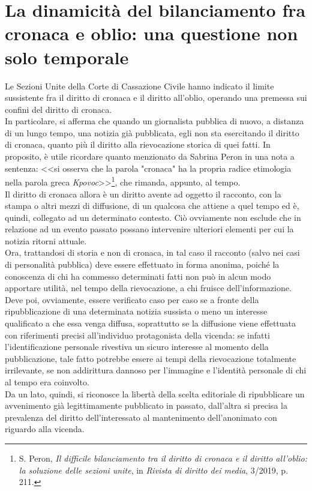 \section{La dinamicità del bilanciamento fra cronaca e oblio: una questione non solo temporale}
Le Sezioni Unite della Corte di Cassazione Civile hanno indicato il limite sussistente fra il diritto di cronaca e il diritto all'oblio, operando una premessa sui confini del diritto di cronaca.
\\In particolare, si afferma che quando un giornalista pubblica di nuovo, a distanza di un lungo tempo, una notizia già pubblicata, egli non sta esercitando il diritto di cronaca, quanto più il diritto alla rievocazione storica di quei fatti. In proposito, è utile ricordare quanto menzionato da Sabrina Peron in una nota a sentenza: <<si osserva che la parola "cronaca" ha la propria radice etimologia nella parola greca \textit{Kpovoc}>>\footnote{S. Peron, \textit{Il difficile bilanciamento tra il diritto di cronaca e il diritto all’oblio: la soluzione delle sezioni unite}, in \textit{Rivista di diritto dei media}, 3/2019, p. 211.}, che rimanda, appunto, al tempo.
\\Il diritto di cronaca allora è un diritto avente ad oggetto il racconto, con la stampa o altri mezzi di diffusione, di un qualcosa che attiene a quel tempo ed è, quindi, collegato ad un determinato contesto. Ciò ovviamente non esclude che in relazione ad un evento passato possano intervenire ulteriori elementi per cui la notizia ritorni attuale.
\\Ora, trattandosi di storia e non di cronaca, in tal caso il racconto (salvo nei casi di personalità pubblica) deve essere effettuato in forma anonima, poiché la conoscenza di chi ha commesso determinati fatti non può in alcun modo apportare utilità, nel tempo della rievocazione, a chi fruisce dell'informazione.
Deve poi, ovviamente, essere verificato caso per caso se a fronte della ripubblicazione di una determinata notizia sussista o meno un interesse qualificato a che essa venga diffusa, soprattutto se la diffusione viene effettuata con riferimenti precisi all'individuo protagonista della vicenda: se infatti l'identificazione personale rivestiva un sicuro interesse al momento della pubblicazione, tale fatto potrebbe essere ai tempi della rievocazione totalmente irrilevante, se non addirittura dannoso per l'immagine e l'identità personale di chi al tempo era coinvolto.
\\Da un lato, quindi, si riconosce la libertà della scelta editoriale di ripubblicare un avvenimento già legittimamente pubblicato in passato, dall'altra si precisa la prevalenza del diritto dell'interessato al mantenimento dell'anonimato con riguardo alla vicenda.
